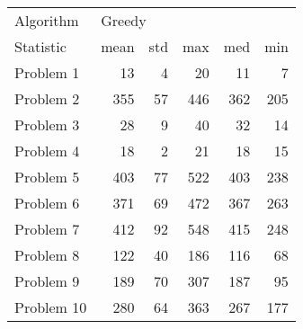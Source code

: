 \begin{tabular}{lrrrrr}
\toprule
Algorithm & \multicolumn{5}{l}{Greedy} \\
Statistic &   mean & std &  max &  med &  min \\
\midrule
Problem 1  &     13 &   4 &   20 &   11 &    7 \\
Problem 2  &    355 &  57 &  446 &  362 &  205 \\
Problem 3  &     28 &   9 &   40 &   32 &   14 \\
Problem 4  &     18 &   2 &   21 &   18 &   15 \\
Problem 5  &    403 &  77 &  522 &  403 &  238 \\
Problem 6  &    371 &  69 &  472 &  367 &  263 \\
Problem 7  &    412 &  92 &  548 &  415 &  248 \\
Problem 8  &    122 &  40 &  186 &  116 &   68 \\
Problem 9  &    189 &  70 &  307 &  187 &   95 \\
Problem 10 &    280 &  64 &  363 &  267 &  177 \\
\bottomrule
\end{tabular}
